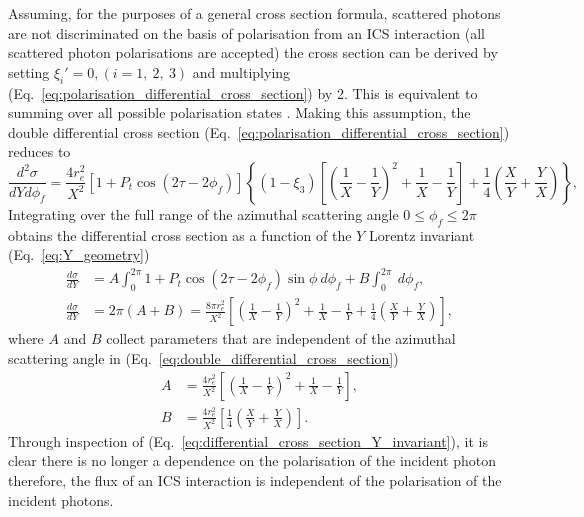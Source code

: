 \documentclass[../main.tex]{subfiles}
\begin{document}
Assuming, for the purposes of a general cross section formula,  scattered photons are not discriminated on the basis of polarisation from an ICS interaction (all scattered photon polarisations are accepted) the cross section can be derived by setting $\xi_{i}' = 0, \left(i=1,~2,~3\right)$ and multiplying (Eq.~\ref{eq:polarisation_differential_cross_section}) by 2. This is equivalent to summing over all possible polarisation states \cite{sun2009characterizations}. Making this assumption, the double differential cross section (Eq.~\ref{eq:polarisation_differential_cross_section}) reduces to
\begin{equation}
\frac{d^{2}\sigma}{dYd\phi_{f}} =  \frac{4r_{e}^{2}}{X^{2}}\left[1+P_{t}\cos\left(2\tau-2\phi_{f}\right)\right]\left\{\left(1-\xi_{3}\right)\left[\left(\frac{1}{X}-\frac{1}{Y}\right)^{2}+\frac{1}{X}-\frac{1}{Y}\right]+\frac{1}{4}\left(\frac{X}{Y}+\frac{Y}{X}\right)\right\},
\label{eq:double_differential_cross_section}    
\end{equation}
Integrating over the full range of the azimuthal scattering angle $0 \leq \phi_{f} \leq 2\pi$ obtains the differential cross section as a function of the $Y$ Lorentz invariant (Eq.~\ref{eq:Y_geometry}) 
\begin{align}
 \frac{d\sigma}{dY} &= A\int_{0}^{2\pi}1+P_{t}\cos\left(2\tau-2\phi_{f}\right)\sin\phi~d\phi_{f}+ B\int_{0}^{2\pi}~d\phi_{f}, \nonumber \\
 \frac{d\sigma}{dY} &= 2\pi\left(A+B\right) = \frac{8\pi r_{e}^{2}}{X^{2}}\left[\left(\frac{1}{X}-\frac{1}{Y}\right)^{2}+\frac{1}{X}-\frac{1}{Y}+\frac{1}{4}\left(\frac{X}{Y}+\frac{Y}{X}\right)\right],
\label{eq:differential_cross_section_Y_invariant}
\end{align}
where $A$ and $B$ collect parameters that are independent of the azimuthal scattering angle in (Eq.~\ref{eq:double_differential_cross_section})
\begin{align}
A &= \frac{4r_{e}^{2}}{X^{2}}\left[\left(\frac{1}{X}-\frac{1}{Y}\right)^{2}+\frac{1}{X}-\frac{1}{Y}\right], \nonumber\\
B &= \frac{4r_{e}^{2}}{X^{2}}\left[\frac{1}{4}\left(\frac{X}{Y}+\frac{Y}{X}\right)\right].
\label{eq:phif_independent_parameters}
\end{align}
Through inspection of (Eq.~\ref{eq:differential_cross_section_Y_invariant}), it is clear there is no longer a dependence on the polarisation of the incident photon therefore, the flux of an ICS interaction is independent of the polarisation of the incident photons.
\end{document}
